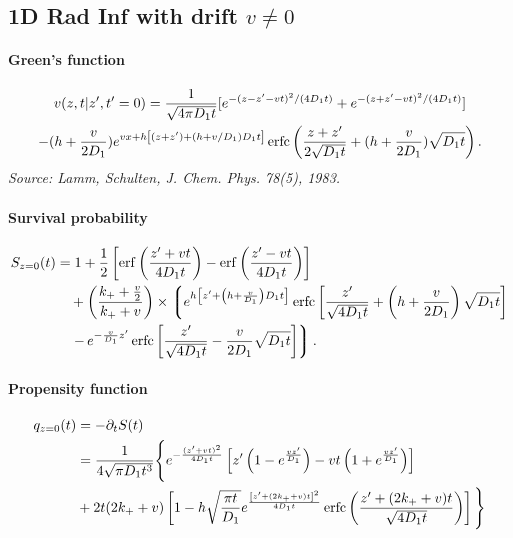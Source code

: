 
\subsection{1D Rad Inf with drift $v\neq 0$}

\paragraph{Green's function}
\begin{multline}
  v(z,t|z',t'=0) = \frac{1}{\sqrt{4\pi D_1 t}} [
  e^{-(z-z'-vt)^2/(4 D_1 t)} +
  e^{-(z+z'-vt)^2/(4 D_1 t)} ] \\
  -(h+\frac{v}{2D_1})e^{vx + h \left[ (z+z') + (h + v/D_1) D_1 t \right]} \operatorname{erfc}\left(\frac{z+z'}{2\sqrt{D_1t}} + (h+\frac{v}{2D_1})\sqrt{D_1t} \right) 
  .\label{green-promoter-solo-drift}
\end{multline}
\textit{Source: Lamm, Schulten, J. Chem. Phys. 78(5), 1983.}

\paragraph{Survival probability}
\begin{align}
  S_{z=0}(t) &= 1 + \frac{1}{2}\left[ \operatorname{erf}\left( \frac{z'+vt}{4D_1 t}\right) - \operatorname{erf}\left( \frac{z'-vt}{4D_1 t}\right) \right] \\
  &\quad + \left(\frac{k_+ + \frac{v}{2}}{k_+ + v}\right) 
  \times \left\lgroup
	e^{h \left[ z' + \left(h+\frac{v}{D_1}\right) D_1 t \right]} \operatorname{erfc}\left[ \frac{z'}{\sqrt{4D_1 t}} + \left(h+\frac{v}{2D_1}\right)\sqrt{D_1 t} \right] \right.\\
	&\left. \quad- \, e^{- \frac{v}{D_1}z'}
	\operatorname{erfc}\left[ \frac{z'}{\sqrt{4D_1 t}} - \frac{v}{2D_1}\sqrt{D_1 t} \right]
  \right\rgroup.
\end{align}

\paragraph{Propensity function}
\begin{align}
  q_{z=0}(t) &= -\partial_t S(t) \\
  &= \frac{1}{4\sqrt{\pi D_1 t^3}}
	\Bigg\lbrace
		e^{-\frac{(z'+vt)^2}{4D_1 t}} \left[ z'\left( 1-e^{\frac{vz'}{D_1}} \right)
						     - vt \left( 1+e^{\frac{vz'}{D_1}}\right) \right] \\
	&
		+ 2t (2k_+ + v) \left[ 1 - h \sqrt{\frac{\pi t}{D_1}} e^{\frac{\left[z'+(2k_+ + v)t\right]^2}{4D_1 t}}
			\operatorname{erfc}\left(\frac{z' + (2k_+ + v)t}{\sqrt{4 D_1 t}} \right)
		\right]	\Bigg\rbrace
\end{align}
\begin{multline}
\end{multline}

